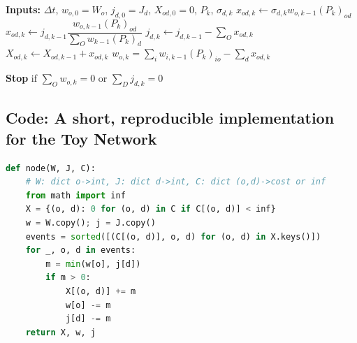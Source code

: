 \begin{algorithm}
\caption{CTM--NODE (move then accept; summation shorthand)}
\label{alg:ctm-node}
\begin{algorithmic}[1]
  \State \textbf{Inputs:} $\Delta t$, $w_{o,0}=W_o$, $j_{d,0}=J_d$, $X_{od,0}=0$, $P_k$, $\sigma_{d,k}$
     
          \State $x_{od,k} \gets \sigma_{d,k} w_{o,k-1}(P_k)_{o d}$
        \EndFor
      \Else {}
          \State $x_{od,k} \gets j_{d,k-1}\dfrac{w_{o,k-1}(P_k)_{od}}{\sum_O w_{k-1}(P_k)_{d}}$
        \EndFor
      \EndIf
      \State $j_{d,k} \gets j_{d,k-1} - \sum_O x_{od,k}$
        \State $X_{od,k} \gets X_{od,k-1} + x_{od,k}$
      \EndFor
    \EndFor
     
        \State $w_{o,k} = \sum_{i} w_{i,k-1}(P_k)_{io} - \sum_{d} x_{od,k}$
    
    \EndFor
    \State \textbf{Stop} if $\sum_O w_{o,k}=0$ or $\sum_D j_{d,k}=0$
  \EndFor
\end{algorithmic}
\end{algorithm}

\clearpage
\subsection{Code: A short, reproducible implementation for the Toy Network}

\begin{lstlisting}[language=Python,caption={Minimal NODE implementation for the toy network.}]
def node(W, J, C):
    # W: dict o->int, J: dict d->int, C: dict (o,d)->cost or inf
    from math import inf
    X = {(o, d): 0 for (o, d) in C if C[(o, d)] < inf}
    w = W.copy(); j = J.copy()
    events = sorted([(C[(o, d)], o, d) for (o, d) in X.keys()])
    for _, o, d in events:
        m = min(w[o], j[d])
        if m > 0:
            X[(o, d)] += m
            w[o] -= m
            j[d] -= m
    return X, w, j
\end{lstlisting}